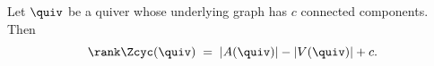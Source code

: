 \begin{theorem}[Rank]\label{sh-0009}
Let $\quiv$ be a quiver whose underlying graph has $c$ connected components. Then
\begin{equation}\label{eq:rank}
\rank \Zcyc(\quiv) \;=\; |A(\quiv)| - |V(\quiv)| + c.
\end{equation}
\end{theorem}